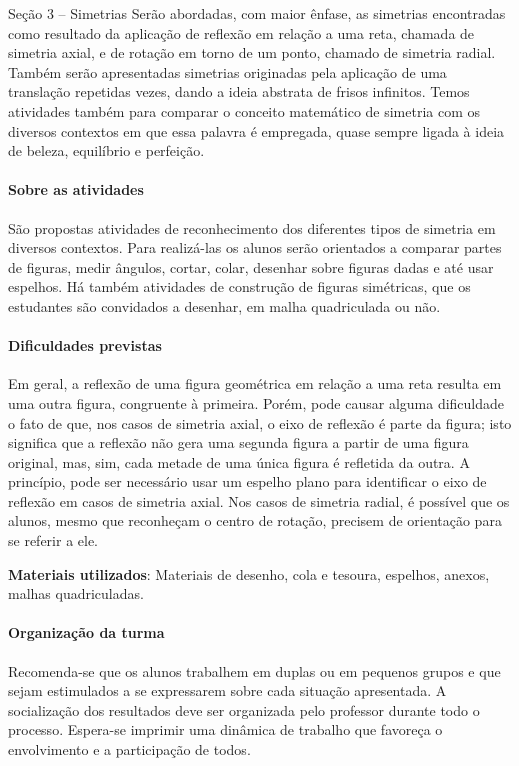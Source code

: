 \begin{paginatexto}{Seção 3 -- Simetrias}
Serão abordadas, com maior ênfase, as simetrias encontradas como resultado da aplicação de reflexão em relação a uma reta, chamada de simetria axial, e de rotação em torno de um ponto, chamado de simetria radial. Também serão apresentadas simetrias originadas pela aplicação de uma translação repetidas vezes, dando a ideia abstrata de frisos infinitos.
Temos atividades também para comparar o conceito matemático de simetria com os diversos contextos em que essa palavra é empregada, quase sempre ligada à ideia de beleza, equilíbrio e perfeição.


\paragraph{Sobre as atividades}

São propostas atividades de reconhecimento dos diferentes tipos de simetria em diversos contextos. Para realizá-las os alunos serão orientados a comparar partes de figuras, medir ângulos, cortar, colar, desenhar sobre figuras dadas e até usar espelhos. Há também atividades de construção de figuras simétricas, que os estudantes são convidados a desenhar, em malha quadriculada ou não.

\paragraph{Dificuldades previstas}

Em geral, a reflexão de uma figura geométrica em relação a uma reta resulta em uma outra figura, congruente à primeira. Porém, pode causar alguma dificuldade o fato de que, nos casos de simetria axial, o eixo de reflexão é parte da figura; isto significa que a reflexão não gera uma segunda figura a partir de uma figura original, mas, sim, cada metade de uma única figura é refletida da outra. A princípio, pode ser necessário usar um espelho plano para identificar o eixo de reflexão em casos de simetria axial.  Nos casos de simetria radial, é possível que os alunos, mesmo que reconheçam o centro de rotação, precisem de orientação para se referir a ele.

\textbf{Materiais utilizados}: Materiais de desenho, cola e tesoura, espelhos, anexos, malhas quadriculadas.

\paragraph{Organização da turma}

Recomenda-se que os alunos trabalhem em duplas ou em pequenos grupos e que sejam estimulados a se expressarem sobre cada situação apresentada. A socialização dos resultados deve ser organizada pelo professor durante todo o processo. Espera-se imprimir uma dinâmica de trabalho que favoreça o envolvimento e a participação de todos. 
\end{paginatexto}


